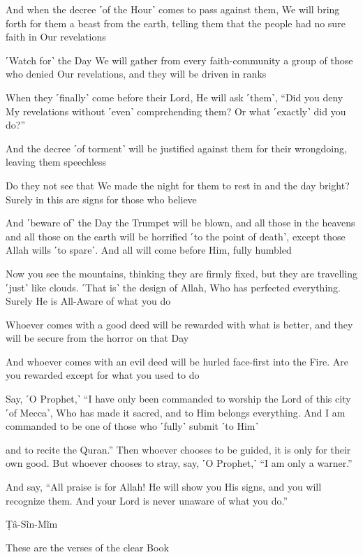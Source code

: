 And when the decree ˹of the Hour˺ comes to pass against them, We will bring forth for them a beast from the earth, telling them that the people had no sure faith in Our revelations

˹Watch for˺ the Day We will gather from every faith-community a group of those who denied Our revelations, and they will be driven in ranks

When they ˹finally˺ come before their Lord, He will ask ˹them˺, “Did you deny My revelations without ˹even˺ comprehending them? Or what ˹exactly˺ did you do?”

And the decree ˹of torment˺ will be justified against them for their wrongdoing, leaving them speechless

Do they not see that We made the night for them to rest in and the day bright? Surely in this are signs for those who believe

And ˹beware of˺ the Day the Trumpet will be blown, and all those in the heavens and all those on the earth will be horrified ˹to the point of death˺, except those Allah wills ˹to spare˺. And all will come before Him, fully humbled

Now you see the mountains, thinking they are firmly fixed, but they are travelling ˹just˺ like clouds. ˹That is˺ the design of Allah, Who has perfected everything. Surely He is All-Aware of what you do

Whoever comes with a good deed will be rewarded with what is better, and they will be secure from the horror on that Day

And whoever comes with an evil deed will be hurled face-first into the Fire. Are you rewarded except for what you used to do

Say, ˹O Prophet,˺ “I have only been commanded to worship the Lord of this city ˹of Mecca˺, Who has made it sacred, and to Him belongs everything. And I am commanded to be one of those who ˹fully˺ submit ˹to Him˺

and to recite the Quran.” Then whoever chooses to be guided, it is only for their own good. But whoever chooses to stray, say, ˹O Prophet,˺ “I am only a warner.”

And say, “All praise is for Allah! He will show you His signs, and you will recognize them. And your Lord is never unaware of what you do.”

Ṭâ-Sĩn-Mĩm

These are the verses of the clear Book

